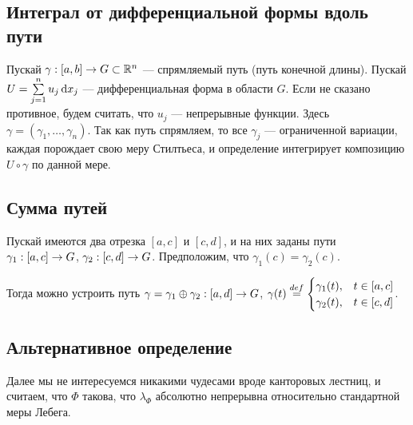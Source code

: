 \documentclass[a4paper]{report}
\begin{document}
    \subsection{Интеграл от дифференциальной формы вдоль пути}
    Пускай $\gamma: [a, b] \rightarrow G \subset \mathbb{R}^n$ --- спрямляемый путь (путь конечной длины).
    Пускай $U = \sum\limits_{j = 1}^{n}u_j \operatorname{d}\! x_j$ --- дифференциальная форма в области $G$.
    Если не сказано противное, будем считать, что $u_j$ --- непрерывные функции.
    Здесь $\gamma = (\gamma_1, \dots, \gamma_n)$.
    Так как путь спрямляем, то все $\gamma_j$ --- ограниченной вариации, каждая порождает свою меру Стилтьеса, и определение интегрирует композицию $U \circ \gamma$ по данной мере.
    \subsection{Сумма путей}
    Пускай имеются два отрезка $[a, c]$ и $[c, d]$, и на них заданы пути $\gamma_1: [a, c] \rightarrow G$, $\gamma_2: [c, d] \rightarrow G$.
    Предположим, что $\gamma_1(c) = \gamma_2(c)$.

    Тогда можно устроить путь $\gamma = \gamma_1 \oplus \gamma_2: [a, d] \rightarrow G$, $\gamma(t) \overset{def}{=} \begin{cases}\gamma_1(t),&t \in [a, c] \\ \gamma_2(t),& t \in [c, d]\end{cases}$.

    \subsection{Альтернативное определение}
    Далее мы не интересуемся никакими чудесами вроде канторовых лестниц, и считаем, что $\Phi$ такова, что $\lambda_\Phi$ абсолютно непрерывна относительно стандартной меры Лебега.
\end{document}
